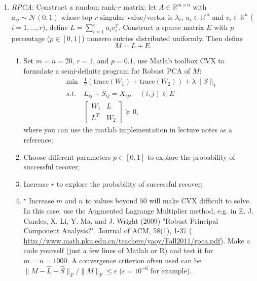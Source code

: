 \documentclass[11pt]{article}
\def\NN{{\mathcal N}}
\def\R{{\mathbb R}}
\def\tr{{\mathrm{trace}}}
\begin{document}
\begin{enumerate}



\item {\em RPCA}: Construct a random rank-$r$ matrix: let $A\in \R^{m\times n}$ with $a_{ij} \sim \NN(0,1)$ whose top-$r$ singular value/vector is $\lambda_i$, $u_i\in \R^m$ and $v_i \in \R^n$ ($i=1,\ldots,r$), define $L = \sum_{i=1}^r u_i v_i^T$. Construct a sparse matrix $E$ with $p$ percentage ($p\in [0,1]$) nonzero entries distributed uniformly. Then define
\[ M = L + E. \]

\begin{enumerate}
\item Set $m=n=20$, $r=1$, and $p=0.1$, use Matlab toolbox CVX to formulate a semi-definite program for Robust PCA of $M$:
\begin{eqnarray} \label{eq:RPCA_SDP}
& \min & \frac{1}{2} (\tr(W_1)+\tr(W_2)) + \lambda \|S\|_1 \\
& s.t. & L_{ij} +S_{ij} = X_{ij}, \quad (i,j)\in E  \nonumber \\
& & \displaystyle \left[ \begin{array}{cc} 
W_1 & L \\
L^T & W_2
\end{array}
\right] \succeq 0, \nonumber
\end{eqnarray}
where you can use the matlab implementation in lecture notes as a reference;
\item Choose different parameters $p\in [0,1]$ to explore the probability of successful recover;
\item Increase $r$ to explore the probability of successful recover;
\item $^\star$ Increase $m$ and $n$ to values beyond $50$ will make CVX difficult to solve. In this case, use the Augmented Lagrange Multiplier method, e.g. in E. J. Candes, X. Li, Y. Ma, and J. Wright (2009) "Robust Principal Component Analysis?". Journal of ACM, 58(1), 1-37 (
\url{http://www.math.pku.edu.cn/teachers/yaoy/Fall2011/rpca.pdf}). Make a code yourself (just a few lines of Matlab or R) and test it for $m=n=1000$. A convergence criterion often used can be $\|M-\hat{L} - \hat{S} \|_F / \|M\|_F \leq \epsilon$ ($\epsilon=10^{-6}$ for example).  
\end{enumerate}



\end{enumerate}
\end{document}
